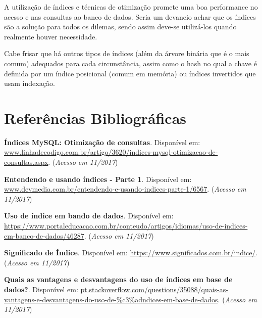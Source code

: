 \documentclass[12pt,a4paper]{article}
\begin{document}
A utilização de índices e técnicas de otimização promete uma boa performance no acesso e nas consultas ao banco de dados. Seria um devaneio achar que os índices são a solução para todos os dilemas, sendo assim deve-se utilizá-los quando realmente houver necessidade.

Cabe frisar que há outros tipos de índices (além da árvore binária que é o mais comum) adequados para cada circunstância, assim como o hash no qual a chave é definida por um índice posicional (comum em memória) ou índices invertidos que usam indexação.

\section{Referências Bibliográficas}
\noindent \textbf{Índices MySQL: Otimização de consultas}. Disponível em: \url {www.linhadecodigo.com.br/artigo/3620/indices-mysql-otimizacao-de-consultas.aspx}. (\textit{Acesso em 11/2017})\\\vspace{0.2cm}

\noindent \textbf{Entendendo e usando índices - Parte 1}. Disponível em: \url {www.devmedia.com.br/entendendo-e-usando-indices-parte-1/6567}. (\textit{Acesso em 11/2017})\\\vspace{0.2cm}

\noindent \textbf{Uso de índice em bando de dados}. Disponível em: \url {https://www.portaleducacao.com.br/conteudo/artigos/idiomas/uso-de-indices-em-banco-de-dados/46287}. (\textit{Acesso em 11/2017})\\\vspace{0.2cm}

\noindent \textbf{Significado de Índice}. Disponível em: \url {https://www.significados.com.br/indice/}. (\textit{Acesso em 11/2017})\\\vspace{0.2cm}

\noindent \textbf{Quais as vantagens e desvantagens do uso de índices em base de dados?}. Disponível em: \url {pt.stackoverflow.com/questions/35088/quais-as-vantagens-e-desvantagens-do-uso-de-\%c3\%adndices-em-base-de-dados}. (\textit{Acesso em 11/2017})
\end{document}
